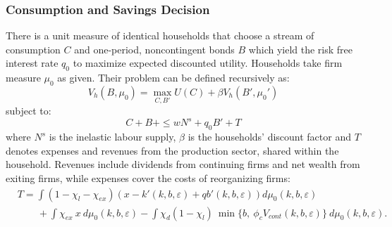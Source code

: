 \documentclass[12pt]{article}
\begin{document}
\subsubsection{Consumption and Savings Decision} \label{sec:Cons and Savings decision}
There is a unit measure of identical households that choose a stream of consumption $C$ and one-period, noncontingent bonds $B$ which yield the risk free interest rate $q_0$ to maximize expected discounted utility. Households take firm measure $\mu_0$ as given. Their problem can be defined recursively as: 
\begin{equation} \label{eq:U_max}
V_h(B, \mu_0) = \max_{C,B'} U(C) + \beta V_h(B',\mu_0')
\end{equation}  
subject to: 
\begin{equation} \label{eq:const_hh}
C + B + \leq w N^s + q_0 B' + T
\end{equation} 
where $N^s$ is the inelastic labour supply, $\beta$ is the households' discount factor and $T$ denotes expenses and revenues from the production sector, shared within the household. Revenues include dividends from continuing firms and net wealth from exiting firms, while expenses cover the costs of reorganizing firms:
\begin{equation} \label{eq:T}
    \begin{split}
        & T = \int (1 - \chi_l - \chi_{ex}) \left( x - k'(k,b,\varepsilon) + qb'(k,b,\varepsilon) \right) d \mu_0(k,b,\varepsilon) \\
        & \qquad + \int \chi_{ex} \ x \ d \mu_0(k,b,\varepsilon) - \int \chi_d (1-\chi_{l}) \ \min\{b, \ \phi_c V_{cont}(k,b, \varepsilon) \} \ d \mu_0(k,b,\varepsilon).
    \end{split}
\end{equation}
\end{document}
